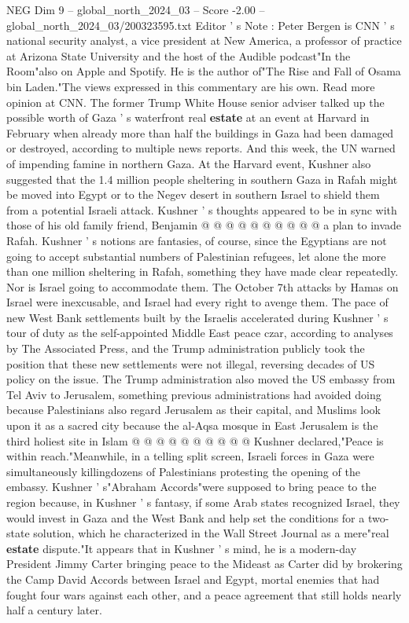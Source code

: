 \begin{textsample}{NEG Dim 9 – global\_north\_2024\_03 – Score -2.00 – global\_north\_2024\_03/200323595.txt}  \label{ex:f9_neg_183}
Editor ' s Note : Peter Bergen is CNN ' s national security analyst, a vice president at New America, a professor of practice at Arizona State University and the host of the Audible podcast"In the Room"also on Apple and Spotify.
He is the author of"The Rise and Fall of Osama bin Laden."The views expressed in this commentary are his own.
Read more opinion at CNN.
The former Trump White House senior adviser talked up the possible worth of Gaza ' s waterfront real \textbf{estate} at an event at Harvard in February when already more than half the buildings in Gaza had been damaged or destroyed, according to multiple news reports.
And this week, the UN warned of impending famine in northern Gaza.
At the Harvard event, Kushner also suggested that the 1.4 million people sheltering in southern Gaza in Rafah might be moved into Egypt or to the Negev desert in southern Israel to shield them from a potential Israeli attack.
Kushner ' s thoughts appeared to be in sync with those of his old family friend, Benjamin @ @ @ @ @ @ @ @ @ @ a plan to invade Rafah.
Kushner ' s notions are fantasies, of course, since the Egyptians are not going to accept substantial numbers of Palestinian refugees, let alone the more than one million sheltering in Rafah, something they have made clear repeatedly.
Nor is Israel going to accommodate them.
The October 7th attacks by Hamas on Israel were inexcusable, and Israel had every right to avenge them.
The pace of new West Bank settlements built by the Israelis accelerated during Kushner ' s tour of duty as the self-appointed Middle East peace czar, according to analyses by The Associated Press, and the Trump administration publicly took the position that these new settlements were not illegal, reversing decades of US policy on the issue.
The Trump administration also moved the US embassy from Tel Aviv to Jerusalem, something previous administrations had avoided doing because Palestinians also regard Jerusalem as their capital, and Muslims look upon it as a sacred city because the al-Aqsa mosque in East Jerusalem is the third holiest site in Islam @ @ @ @ @ @ @ @ @ @ Kushner declared,"Peace is within reach."Meanwhile, in a telling split screen, Israeli forces in Gaza were simultaneously killingdozens of Palestinians protesting the opening of the embassy.
Kushner ' s"Abraham Accords"were supposed to bring peace to the region because, in Kushner ' s fantasy, if some Arab states recognized Israel, they would invest in Gaza and the West Bank and help set the conditions for a two-state solution, which he characterized in the Wall Street Journal as a mere"real \textbf{estate} dispute."It appears that in Kushner ' s mind, he is a modern-day President Jimmy Carter bringing peace to the Mideast as Carter did by brokering the Camp David Accords between Israel and Egypt, mortal enemies that had fought four wars against each other, and a peace agreement that still holds nearly half a century later.

\end{textsample}
